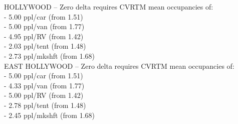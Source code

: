 \documentclass[11pt]{article}
\def\selah{SELAH}
\begin{document}
HOLLYWOOD -- Zero delta requires CVRTM mean occupancies of:\\
 - 5.00 ppl/car (from 1.51)\\
 - 5.00 ppl/van (from 1.77)\\
 - 4.95 ppl/RV (from 1.42)\\
 - 2.03 ppl/tent (from 1.48)\\
 - 2.73 ppl/mkshft (from 1.68)\\

EAST HOLLYWOOD -- Zero delta requires CVRTM mean occupancies of:\\
 - 5.00 ppl/car (from 1.51)\\
 - 4.33 ppl/van (from 1.77)\\
 - 5.00 ppl/RV (from 1.42)\\
 - 2.78 ppl/tent (from 1.48)\\
 - 2.45 ppl/mkshft (from 1.68)

%
%
%


\clearpage

\end{document}
